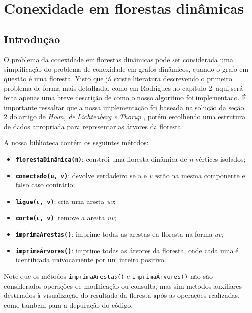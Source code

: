 
\chapter{Conexidade em florestas dinâmicas}

\section{Introdução}

O problema da conexidade em florestas dinâmicas pode ser considerada uma simplificação do problema de conexidade em grafos dinâmicos, quando o grafo em questão é uma floresta. Visto que já existe literatura descrevendo o primeiro problema de forma mais detalhada, como em Rodrigues \cite{arthur} no capítulo 2, aqui será feita apenas uma breve descrição de como o nosso algoritmo foi implementado. É importante ressaltar que a nossa implementação foi baseada na solução da seção 2 do artigo de \textit{Holm, de Lichtenberg e Thorup} \cite{jacob_holm}, porém escolhendo uma estrutura de dados apropriada para representar as árvores da floresta.

A nossa biblioteca contém os seguintes métodos:

\begin{itemize}
    \item \texttt{\textbf{florestaDinâmica(n)}}: constrói uma floresta dinâmica de $n$ vértices isolados;
    \item \texttt{\textbf{conectado(u, v)}}: devolve verdadeiro se \textit{u} e \textit{v} estão na mesma componente e falso caso contrário;
    \item \texttt{\textbf{ligue(u, v)}}: cria uma aresta \textit{uv};
    \item \texttt{\textbf{corte(u, v)}}: remove a aresta \textit{uv};
    \item \texttt{\textbf{imprimaArestas()}}: imprime todas as arestas da floresta na forma \textit{uv};
    \item \texttt{\textbf{imprimaÁrvores()}}: imprime todas as árvores da floresta, onde cada uma é identificada univocamente por um inteiro positivo.
\end{itemize}

Note que os métodos \texttt{imprimaArestas()} e \texttt{imprimaÁrvores()} não são considerados operações de modificação ou consulta, mas sim métodos auxiliares destinados à visualização do resultado da floresta após as operações realizadas, como também para a depuração do código.  

